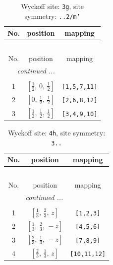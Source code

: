 \documentclass[fleqn,8pt]{jsarticle}
\begin{document}
\begin{longtable}{ccc}
\caption{Wyckoff site: {\tt 3g}, site symmetry: {\tt ..2/m'}}
 \\
 \hline \hline
No. & position & mapping \\ \hline \endfirsthead

\multicolumn{2}{l}{\tablename\ \thetable{}} \\
 \hline \hline
No. & position & mapping \\ \hline \endhead

 \hline \hline
\multicolumn{2}{r}{\footnotesize\it continued ...} \\ \endfoot

 \hline \hline
\multicolumn{2}{r}{} \\ \endlastfoot

1 & $\left[ \frac{1}{2},\, 0,\, \frac{1}{2} \right]$ & {\tt [1,5,7,11]} \\ \hline
2 & $\left[ 0,\, \frac{1}{2},\, \frac{1}{2} \right]$ & {\tt [2,6,8,12]} \\ \hline
3 & $\left[ \frac{1}{2},\, \frac{1}{2},\, \frac{1}{2} \right]$ & {\tt [3,4,9,10]} \\
\end{longtable}
\renewcommand{\arraystretch}{1.2}
\begin{longtable}{ccc}
\caption{Wyckoff site: {\tt 4h}, site symmetry: {\tt 3..}}
 \\
 \hline \hline
No. & position & mapping \\ \hline \endfirsthead

\multicolumn{2}{l}{\tablename\ \thetable{}} \\
 \hline \hline
No. & position & mapping \\ \hline \endhead

 \hline \hline
\multicolumn{2}{r}{\footnotesize\it continued ...} \\ \endfoot

 \hline \hline
\multicolumn{2}{r}{} \\ \endlastfoot

1 & $\left[ \frac{1}{3},\, \frac{2}{3},\, z \right]$ & {\tt [1,2,3]} \\ \hline
2 & $\left[ \frac{1}{3},\, \frac{2}{3},\, - z \right]$ & {\tt [4,5,6]} \\ \hline
3 & $\left[ \frac{2}{3},\, \frac{1}{3},\, - z \right]$ & {\tt [7,8,9]} \\ \hline
4 & $\left[ \frac{2}{3},\, \frac{1}{3},\, z \right]$ & {\tt [10,11,12]} \\
\end{longtable}
\end{document}
